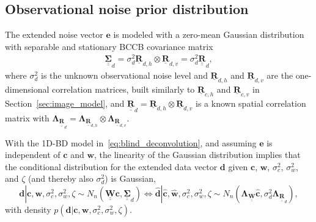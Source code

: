 \documentclass[12pt]{article}
\newcommand{\mycirc}[1] {\underline{\bm{#1}}}
\newcommand{\mybcirc}[1] {\underline{\underline{\bm{#1}}}}
\begin{document}
\subsection{Observational noise prior distribution}\label{sec:noise_model}
The extended noise vector $\bm{e}$ is modeled with a zero-mean Gaussian distribution with separable and stationary BCCB covariance matrix
\begin{align} \label{eq:covariance_d}
\mybcirc{\Sigma}_d=\sigma_d^2 
\mycirc{R}_{d,h}\otimes \mycirc{R}_{d,v} = \sigma_d^2 \mybcirc{R}_d,
\end{align}
where $\sigma_d^2$ is the unknown observational noise level and $\mycirc{R}_{d,h}$ and $\mycirc{R}_{d,v}$
are the one-dimensional correlation matrices, built similarly to $\mycirc{R}_{c,h}$ and $\mycirc{R}_{c,v}$ in Section~\ref{sec:image_model}, and $\mybcirc{R}_d=\mycirc{R}_{d,h} \otimes \mycirc{R}_{d,v}$ is a known spatial correlation matrix with $\bm{\Lambda}_{\mybcirc{R}_{d}} =\bm{\Lambda}_{\mycirc{R}_{d, h}} \otimes \bm{\Lambda}_{\mycirc{R}_{d, v}}$.

With the 1D-BD model in~\eqref{eq:blind_deconvolution}, and assuming $\bm{e}$ is independent of $\bm{c}$ and $\bm{w}$, the linearity of the Gaussian distribution implies that the conditional distribution for the extended data vector $\bm{d}$ given $\bm{c}$, $\bm{w}$, $\sigma_c^2$, $\sigma_w^2$, and $\zeta$ (and thereby also $\sigma_d^2$) is Gaussian, 
\begin{equation} \label{eq:data_model}
\bm{d}|\bm{c},\bm{w},\sigma_c^2,\sigma_w^2,\zeta \sim N_{n}(\mybcirc{W} \bm{c}, \mybcirc{\Sigma}_d) \iff
\hat{\bm{d}}|\hat{\bm{c}},\hat{\bm{w}},\sigma_c^2,\sigma_w^2,\zeta \sim N_{n}(\bm{\Lambda}_{\mybcirc{W}} \hat{\bm{c}}, \sigma_d^2 \bm{\Lambda}_{\mybcirc{R}_{d}}),
\end{equation}
with density $p(\bm{d}|\bm{c},\bm{w},\sigma_c^2,\sigma_w^2,\zeta)$.
\end{document}
